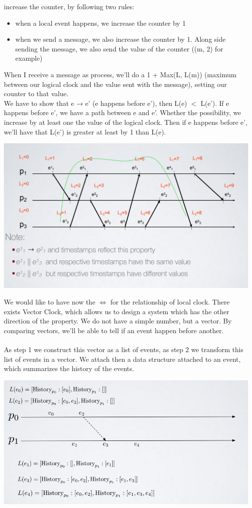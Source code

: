 \documentclass[11pt, a4paper]{article}
\begin{document}
increase the counter, by following two rules:
\begin{itemize}
    \item when a local event happens, we increase the counter by  1
    \item when we send a message, we also increase the counter by 1. Along side sending the message, we also send the value of the counter ((m, 2) for example)
\end{itemize}
When I receive a message as process, we'll do a 1 + Max(L, L(m)) (maximum
between our logical clock and the value sent with the message), setting our counter
to that value.\\
We have to show that e → e' (e happens before e'), then L(e) $<$ L(e'). If e happens
before e', we have a path between e and e'. Whether the possibility, we increase by
at least one the value of the logical clock. Then if e happens before e', we'll have
that L(e') is greater at least by 1 than L(e).
\begin{center}
    \includegraphics[scale=0.5]{img/logical time/ex2.png}
\end{center}
We would like to have now the $\iff$ for the relationship of local clock. There
exists Vector Clock, which allows us to design a system which has the other
direction of the property. We do not have a simple number, but a vector. By
comparing vectors, we'll be able to tell if an event happen before another.\\\\
As step 1 we construct this vector as a list of events, as step 2 we transform this
list of events in a vector. We attach then a data structure attached to an event,
which summarizes the history of the events.
\begin{center}
    \includegraphics[scale=0.6]{img/logical time/ex3.png}
\end{center}
\end{document}
